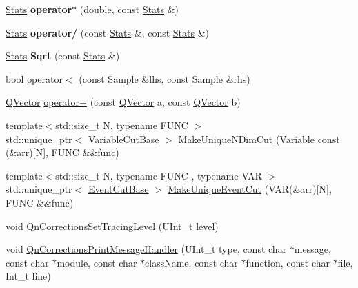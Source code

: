 \begin{DoxyCompactItemize}
\item 
\mbox{\label{namespaceQn_a9a39588961bef431da4cb4c7c833a1cf}} 
\mbox{\hyperlink{classQn_1_1Stats}{Stats}} {\bfseries operator$\ast$} (double, const \mbox{\hyperlink{classQn_1_1Stats}{Stats}} \&)
\item 
\mbox{\label{namespaceQn_ac4d713590aae34167212a5eb73f4a563}} 
\mbox{\hyperlink{classQn_1_1Stats}{Stats}} {\bfseries operator/} (const \mbox{\hyperlink{classQn_1_1Stats}{Stats}} \&, const \mbox{\hyperlink{classQn_1_1Stats}{Stats}} \&)
\item 
\mbox{\label{namespaceQn_ac0a10d62f84da8ede21836d3cebefb5e}} 
\mbox{\hyperlink{classQn_1_1Stats}{Stats}} {\bfseries Sqrt} (const \mbox{\hyperlink{classQn_1_1Stats}{Stats}} \&)
\item 
bool \mbox{\hyperlink{namespaceQn_a4db416e354a4159920fea6442cd8aa99}{operator$<$}} (const \mbox{\hyperlink{structQn_1_1Sample}{Sample}} \&lhs, const \mbox{\hyperlink{structQn_1_1Sample}{Sample}} \&rhs)
\item 
\mbox{\hyperlink{classQn_1_1QVector}{Q\+Vector}} \mbox{\hyperlink{namespaceQn_ad43c17f0ae71f88de7bba6a9aa04de93}{operator+}} (const \mbox{\hyperlink{classQn_1_1QVector}{Q\+Vector}} a, const \mbox{\hyperlink{classQn_1_1QVector}{Q\+Vector}} b)
\item 
{\footnotesize template$<$std\+::size\+\_\+t N, typename F\+U\+NC $>$ }\\std\+::unique\+\_\+ptr$<$ \mbox{\hyperlink{structQn_1_1VariableCutBase}{Variable\+Cut\+Base}} $>$ \mbox{\hyperlink{namespaceQn_ab8bcaebc0a5dd8c6c529aebb582441c3}{Make\+Unique\+N\+Dim\+Cut}} (\mbox{\hyperlink{classQn_1_1Variable}{Variable}} const (\&arr)\mbox{[}N\mbox{]}, F\+U\+NC \&\&func)
\item 
{\footnotesize template$<$std\+::size\+\_\+t N, typename F\+U\+NC , typename V\+AR $>$ }\\std\+::unique\+\_\+ptr$<$ \mbox{\hyperlink{structQn_1_1EventCutBase}{Event\+Cut\+Base}} $>$ \mbox{\hyperlink{namespaceQn_adfbbdb0bce6b19511f94ddbe2511ce16}{Make\+Unique\+Event\+Cut}} (V\+AR(\&arr)\mbox{[}N\mbox{]}, F\+U\+NC \&\&func)
\item 
void \mbox{\hyperlink{namespaceQn_a9a70c46bf6f78f0b5379c0d80d42083a}{Qn\+Corrections\+Set\+Tracing\+Level}} (U\+Int\+\_\+t level)
\item 
void \mbox{\hyperlink{namespaceQn_a66d3bfaf2a43c976eb0d05765d36ecb2}{Qn\+Corrections\+Print\+Message\+Handler}} (U\+Int\+\_\+t type, const char $\ast$message, const char $\ast$module, const char $\ast$class\+Name, const char $\ast$function, const char $\ast$file, Int\+\_\+t line)

\end{DoxyCompactItemize}
